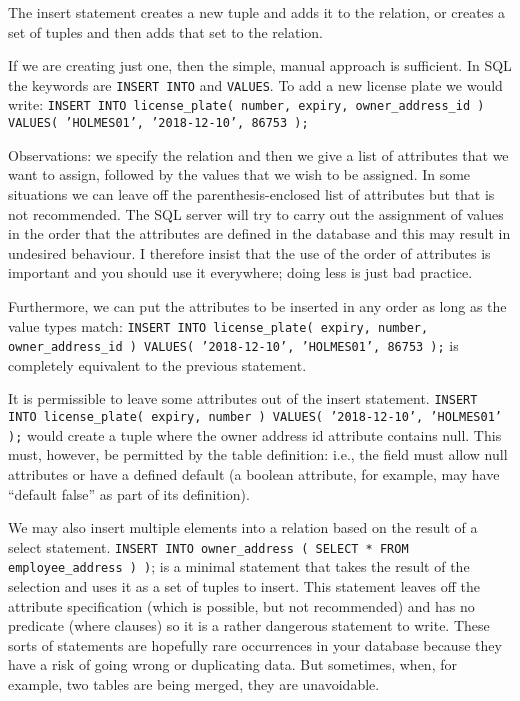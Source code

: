 The insert statement creates a new tuple and adds it to the relation, or creates a set of tuples and then adds that set to the relation.

If we are creating just one, then the simple, manual approach is sufficient. In SQL the keywords are \texttt{INSERT INTO} and \texttt{VALUES}. To add a new license plate we would write: \texttt{INSERT INTO license\_plate( number, expiry, owner\_address\_id ) VALUES( 'HOLMES01', '2018-12-10', 86753 );} 

Observations: we specify the relation and then we give a list of attributes that we want  to assign, followed by the values that we wish to be assigned. In some situations we can leave off the parenthesis-enclosed list of attributes but that is not recommended. The SQL server will try to carry out the assignment of values in the order that the attributes are defined in the database and this may result in undesired behaviour. I therefore insist that the use of the order of attributes is important and you should use it everywhere; doing less is just bad practice. 

Furthermore, we can put the attributes to be inserted in any order as long as the value types match: \texttt{INSERT INTO license\_plate( expiry, number, owner\_address\_id ) VALUES( '2018-12-10', 'HOLMES01', 86753 );}  is completely equivalent to the previous statement.

It is permissible to leave some attributes out of the insert statement. \texttt{INSERT INTO license\_plate( expiry, number ) VALUES( '2018-12-10', 'HOLMES01' );} would create a tuple where the owner address id attribute contains null. This must, however, be permitted by the table definition: i.e., the field must allow null attributes or have a defined default (a boolean attribute, for example, may have ``default false'' as part of its definition).

We may also insert multiple elements into a relation based on the result of a select statement. \texttt{INSERT INTO owner\_address ( SELECT * FROM employee\_address ) )}; is a minimal statement that takes the result of the selection and uses it as a set of tuples to insert. This statement leaves off the attribute specification (which is possible, but not recommended) and has no predicate (where clauses) so it is a rather dangerous statement to write. These sorts of statements are hopefully rare occurrences in your database because they have a risk of going wrong or duplicating data. But sometimes, when, for example, two tables are being merged, they are unavoidable.

